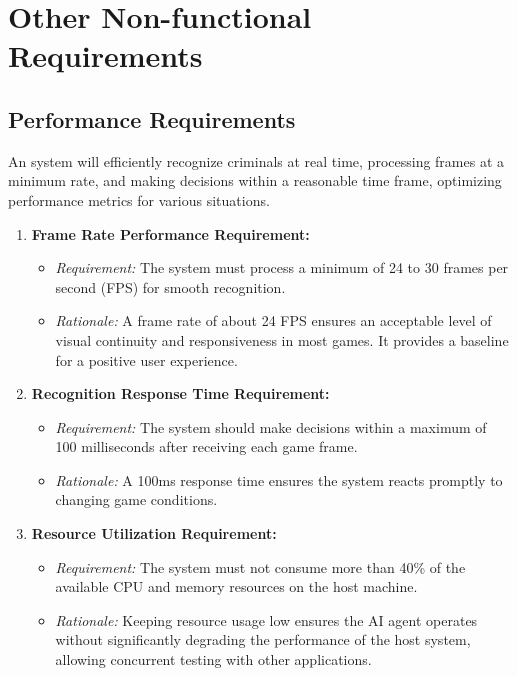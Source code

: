 \section{Other Non-functional Requirements}
    \subsection{Performance Requirements}
        An system will efficiently recognize criminals at real time, processing frames at a minimum rate, and making decisions within a reasonable time frame, optimizing performance metrics for various situations.
        \begin{enumerate}
            \item \textbf{Frame Rate Performance Requirement:}
                \begin{itemize}
                    \item \textit{Requirement:} The system must process a minimum of 24 to 30 frames per second (FPS) for smooth recognition.
                    \item \textit{Rationale:} A frame rate of about 24 FPS ensures an acceptable level of visual continuity and responsiveness in most games. It provides a baseline for a positive user experience.
                \end{itemize}
            \item \textbf{Recognition Response Time Requirement:}
                \begin{itemize}
                    \item \textit{Requirement:} The system should make decisions within a maximum of 100 milliseconds after receiving each game frame.
                    \item \textit{Rationale:} A 100ms response time ensures the system reacts promptly to changing game conditions.
                \end{itemize}
            \item \textbf{Resource Utilization Requirement:}
                \begin{itemize}
                    \item \textit{Requirement:} The system must not consume more than 40\% of the available CPU and memory resources on the host machine.
                    \item \textit{Rationale:} Keeping resource usage low ensures the AI agent operates without significantly degrading the performance of the host system, allowing concurrent testing with other applications.

\end{itemize}
\end{enumerate}
